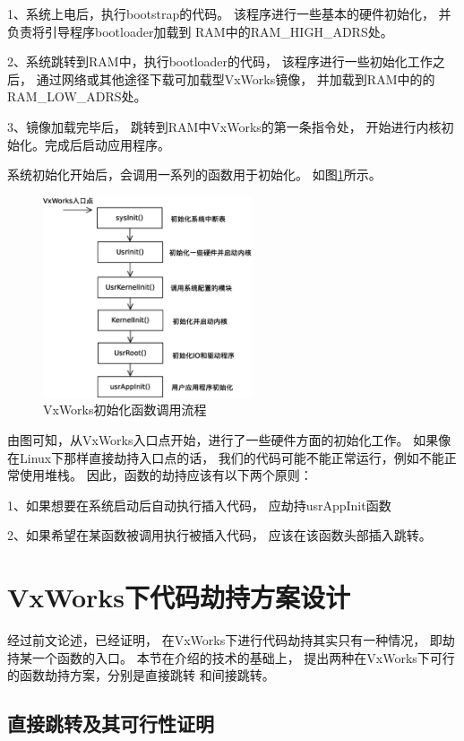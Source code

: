 1、系统上电后，执行bootstrap的代码。
该程序进行一些基本的硬件初始化，
并负责将引导程序bootloader加载到
RAM中的RAM\_HIGH\_ADRS处。

2、系统跳转到RAM中，执行bootloader的代码，
该程序进行一些初始化工作之后，
通过网络或其他途径下载可加载型VxWorks镜像，
并加载到RAM中的的RAM\_LOW\_ADRS处。

3、镜像加载完毕后，
跳转到RAM中VxWorks的第一条指令处，
开始进行内核初始化。完成后启动应用程序。

系统初始化开始后，会调用一系列的函数用于初始化。
如图\ref{init}所示。

\begin{figure}[h!]
    \centering
    \includegraphics[width=0.55\textwidth]{figure/init.eps}
    \caption{VxWorks初始化函数调用流程}
    \label{init}
\end{figure}

由图可知，从VxWorks入口点开始，进行了一些硬件方面的初始化工作。
如果像在Linux下那样直接劫持入口点的话，
我们的代码可能不能正常运行，例如不能正常使用堆栈。
因此，函数的劫持应该有以下两个原则：

1、如果想要在系统启动后自动执行插入代码，
应劫持usrAppInit函数

2、如果希望在某函数被调用执行被插入代码，
应该在该函数头部插入跳转。

\section{VxWorks下代码劫持方案设计}


经过前文论述，已经证明，
在VxWorks下进行代码劫持其实只有一种情况，
即劫持某一个函数的入口。
本节在\label{section_hijcak}介绍的技术的基础上，
提出两种在VxWorks下可行的函数劫持方案，分别是直接跳转
和间接跳转。


\subsection{直接跳转及其可行性证明}

